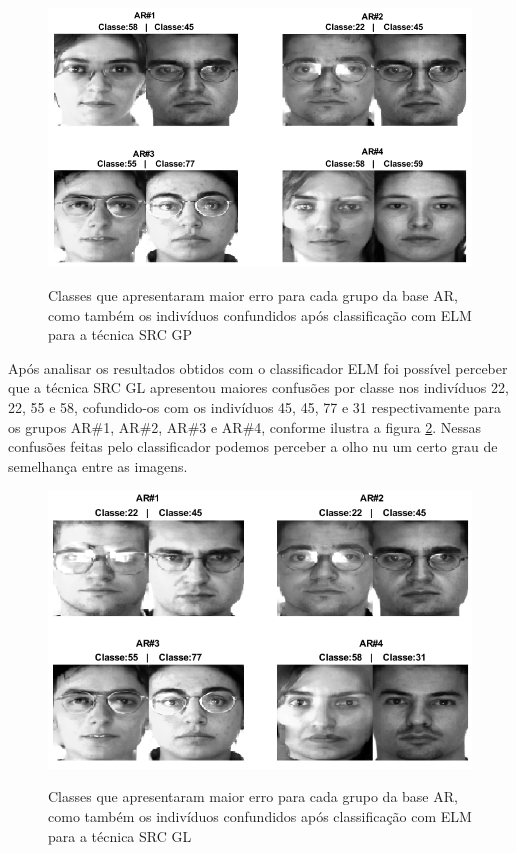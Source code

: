 \begin{figure}[H]
\centering
\caption{Classes que apresentaram maior erro para cada grupo da base AR, como também os indivíduos confundidos após classificação com ELM para a técnica SRC GP}
\includegraphics[scale=0.6]{imgs4/classes_confudidas_SRC_Poisson}
\label{fig:classes_erradas_src_gp}
\end{figure}


Após analisar os resultados obtidos com o classificador ELM foi possível perceber que a técnica SRC GL apresentou maiores confusões por classe nos indivíduos 22, 22, 55 e 58, cofundido-os com os indivíduos 45, 45, 77 e 31 respectivamente para os grupos AR\#1, AR\#2, AR\#3 e AR\#4, conforme ilustra a figura \ref{fig:classes_erradas_src_gl}. Nessas confusões feitas pelo classificador podemos perceber a olho nu um certo grau de semelhança entre as imagens.

\begin{figure}[H]
\centering
\caption{Classes que apresentaram maior erro para cada grupo da base AR, como também os indivíduos confundidos após classificação com ELM para a técnica SRC GL}
\includegraphics[scale=0.6]{imgs4/classes_confudidas_SRC_Laplace}
\label{fig:classes_erradas_src_gl}
\end{figure}



